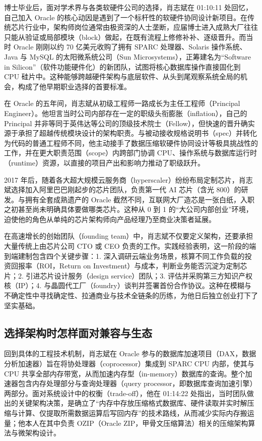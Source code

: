 \documentclass[UTF8,a4paper,11pt,fontset=fandol]{ctexart}
\begin{document}
博士毕业后，面对学术界与各类软硬件公司的选择，肖志斌在 01:10:11 处回忆，自己加入 Oracle 的核心动因是遇到了一个标杆性的软硬件协同设计新项目。在传统芯片行业中，架构师岗位通常由极资深的人士垄断，应届博士进入成熟大厂往往只能从验证或局部模块（block）做起，在既有流程上修修补补、逐级晋升。而当时 Oracle 刚刚以约 70 亿美元收购了拥有 SPARC 处理器、Solaris 操作系统、Java 与 MySQL 的太阳微系统公司（Sun Microsystems），正筹建名为“Software in Silicon”（软件功能硬件化）的新团队，试图将核心数据库操作直接固化到 CPU 硅片中。这种能够跨越硬件架构与底层软件、从头到尾观察系统全局的机会，构成了他早期职业选择的首要标准。

在 Oracle 的五年间，肖志斌从初级工程师一路成长为主任工程师（Principal Engineer）。他坦言当时公司内部存在一定的职级头衔膨胀（inflation），自己的 Principal 并非等同于英伟达等公司的顶级技术院士（Fellow），但快速的晋升确实源于承担了超越传统模块设计的架构职责。与被动接收规格说明书（spec）并转化为代码的普通工程师不同，他主动接手了数据压缩软硬件协同设计等极具挑战性的工作，并在更大职责范围（scope）内跨部门协调 CPU、操作系统与数据库运行时（runtime）资源，以直接的项目产出和影响力推动了职级跃升。

2017 年后，随着各大超大规模云服务商（hyperscaler）纷纷布局定制芯片，肖志斌选择加入阿里巴巴刚起步的芯片团队，负责第一代 AI 芯片（含光 800）的研发。与拥有全套成熟遗产的 Oracle 截然不同，互联网大厂造芯是一张白纸，入职之初甚至尚未明确具体要做哪类芯片。这种从 0 到 1 的“大公司内部创业”环境，迫使他的角色从单纯的芯片架构师向产品经理乃至商业决策者延展。

在高速增长的创始团队（founding team）中，肖志斌不仅要定义架构，还要承担大量传统上由芯片公司 CTO 或 CEO 负责的工作。实践经验表明，这一阶段的端到端建制包含四个关键步骤：1. 深入调研云端业务场景，核算不同工作负载的投资回报率（ROI，Return on Investment）与成本，判断业务能否沉淀为定制芯片；2. 引进芯片设计服务（design service）团队；3. 评估并采购第三方知识产权核（IP）；4. 与晶圆代工厂（foundry）谈判并签署首份合作协议。这种在模糊与不确定性中寻找确定性、拉通商业与技术全链条的历练，为他日后独立创业打下了坚实基础。

\subsection{选择架构时怎样面对兼容与生态}
回到具体的工程技术机制，肖志斌在 Oracle 参与的数据库加速项目（DAX，数据分析加速器）旨在将协处理器（coprocessor）集成到 SPARC CPU 内部，使其与 CPU 共享全部内存带宽，从而加速内存型（in-memory）数据库的查询。整个加速器包含内存处理部分与查询处理器（query processor，即数据库查询加速引擎）两部分。面对系统设计中的权衡（trade-off），他在 01:14:22 处指出，当时团队做出的关键架构决策，是确立了“内存中存放压缩格式数据库、硬件读取并实时解压缩与计算、仅提取所需数据运算后写回内存”的技术路线，从而减少实际内存搬运量；他本人在其中负责 OZIP（Oracle ZIP，甲骨文压缩算法）相关的压缩架构算法与微架构设计。
\end{document}
